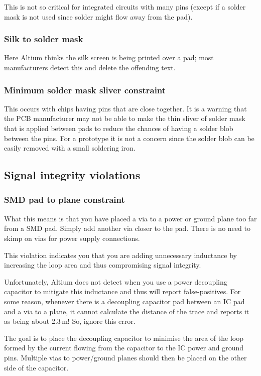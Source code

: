 This is not so critical for integrated circuits with many pins (except
if a solder mask is not used since solder might flow away from the
pad).


\subsubsection{Silk to solder mask}

Here Altium thinks the silk screen is being printed over a pad; most
manufacturers detect this and delete the offending text.


\subsubsection{Minimum solder mask sliver constraint}

This occurs with chips having pins that are close together.  It is a
warning that the PCB manufacturer may not be able to make the thin
sliver of solder mask that is applied between pads to reduce the
chances of having a solder blob between the pins.  For a prototype it
is not a concern since the solder blob can be easily removed with a
small soldering iron.


\subsection{Signal integrity violations}

\subsubsection{SMD pad to plane constraint}

What this means is that you have placed a via to a power or ground
plane too far from a SMD pad.  Simply add another via closer to the
pad.  There is no need to skimp on vias for power supply connections.

This violation indicates you that you are adding unnecessary
inductance by increasing the loop area and thus compromising signal
integrity.

Unfortunately, Altium does not detect when you use a power decoupling
capacitor to mitigate this inductance and thus will report
false-positives.  For some reason, whenever there is a decoupling
capacitor pad between an IC pad and a via to a plane, it cannot
calculate the distance of the trace and reports it as being about
2.3\,m!  So, ignore this error.

The goal is to place the decoupling capacitor to minimise the area of
the loop formed by the current flowing from the capacitor to the IC
power and ground pins.  Multiple vias to power/ground planes should
then be placed on the other side of the capacitor.
